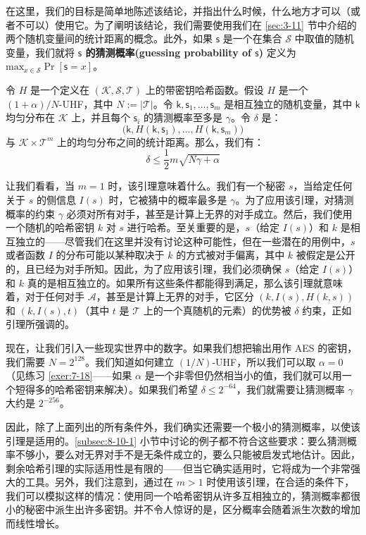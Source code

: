 在这里，我们的目标是简单地陈述该结论，并指出什么时候，什么地方才可以（或者不可以）使用它。为了阐明该结论，我们需要使用我们在 \ref{sec:3-11} 节中介绍的两个随机变量间的统计距离的概念。此外，如果 $\mathsf{s}$ 是一个在集合 $\mathcal{S}$ 中取值的随机变量，我们就将 \textbf{$\mathsf{s}$ 的猜测概率(guessing probability of $\mathsf{s}$)} 定义为 $\mathrm{max}_{x\in\mathcal{S}}\Pr[\mathsf{s}=x]$。

\begin{theorem}[剩余哈希引理]\label{theo:8-11}
令 $H$ 是一个定义在 $(\mathcal{K},\mathcal{S},\mathcal{T})$ 上的带密钥哈希函数。假设 $H$ 是一个 $(1+\alpha)/N$-UHF，其中 $N:=|\mathcal{T}|$。令 $\mathsf{k},\mathsf{s}_1,\dots,\mathsf{s}_m$ 是相互独立的随机变量，其中 $\mathsf{k}$ 均匀分布在 $\mathcal{K}$ 上，并且每个 $\mathsf{s}_i$ 的猜测概率至多是 $\gamma$。令 $\delta$ 是：
\[
\big(\mathsf{k},H(\mathsf{k},\mathsf{s}_1),\dots,H(\mathsf{k},\mathsf{s}_m)\big)
\]
与 $\mathcal{K}\times\mathcal{T}^m$ 上的均匀分布之间的统计距离。那么，我们有：
\[
\delta\leq
\frac{1}{2}m\sqrt{N\gamma+\alpha}
\]
\end{theorem}

让我们看看，当 $m=1$ 时，该引理意味着什么。我们有一个秘密 $s$，当给定任何关于 $s$ 的侧信息 $I(s)$ 时，它被猜中的概率最多是 $\gamma$。为了应用该引理，对猜测概率的约束 $\gamma$ 必须对所有对手，甚至是计算上无界的对手成立。然后，我们使用一个随机的哈希密钥 $k$ 对 $s$ 进行哈希。至关重要的是，$s$（给定 $I(s)$）和 $k$ 是相互独立的——尽管我们在这里并没有讨论这种可能性，但在一些潜在的用例中，$s$ 或者函数 $I$ 的分布可能以某种取决于 $k$ 的方式被对手偏离，其中 $k$ 被假定是公开的，且已经为对手所知。因此，为了应用该引理，我们必须确保 $s$（给定 $I(s)$）和 $k$ 真的是相互独立的。如果所有这些条件都能得到满足，那么该引理就意味着，对于任何对手 $\mathcal{A}$，甚至是计算上无界的对手，它区分 $(k,I(s),H(k,s))$ 和 $(k,I(s),t)$（其中 $t$ 是 $\mathcal{T}$ 上的一个真随机的元素）的优势被 $\delta$ 约束，正如引理所强调的。

现在，让我们引入一些现实世界中的数字。如果我们想把输出用作 AES 的密钥，我们需要 $N=2^{128}$。我们知道如何建立 $(1/N)$-UHF，所以我们可以取 $\alpha=0$（见练习 \ref{exer:7-18}——如果 $\alpha$ 是一个非零但仍然相当小的值，我们就可以用一个短得多的哈希密钥来解决）。如果我们希望 $\delta\leq2^{-64}$，我们就需要让猜测概率 $\gamma$ 大约是 $2^{-256}$。

因此，除了上面列出的所有条件外，我们确实还需要一个极小的猜测概率，以使该引理是适用的。\ref{subsec:8-10-1} 小节中讨论的例子都不符合这些要求：要么猜测概率不够小，要么对无界对手不是无条件成立的，要么只能被启发式地估计。因此，剩余哈希引理的实际适用性是有限的——但当它确实适用时，它将成为一个非常强大的工具。另外，我们注意到，通过在 $m>1$ 时使用该引理，在合适的条件下，我们可以模拟这样的情况：使用同一个哈希密钥从许多互相独立的，猜测概率都很小的秘密中派生出许多密钥。并不令人惊讶的是，区分概率会随着派生次数的增加而线性增长。

